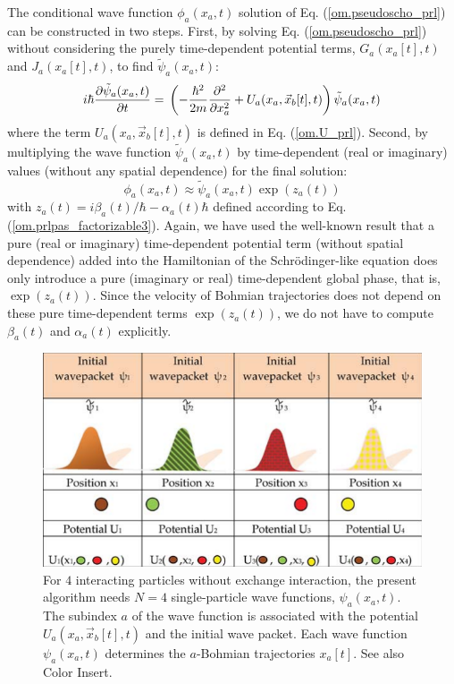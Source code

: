 \documentclass[nofootinbib, secnumarabic, amsmath, nobibnotes,11pt,aps,pra, floatfix]{revtex4-1}
\newcommand{\eref}[1]{Eq. (\ref{#1})}
\begin{document}
The conditional wave function $\phi_{a}(x_a,t)$ solution of \eref{om.pseudoscho_prl} can be constructed in two steps. First, by solving \eref{om.pseudoscho_prl} without considering the purely time-dependent potential terms, $G_{a}(x_a[t],t)$ and $J_{a}(x_a[t],t)$, to find $\tilde{\psi}_a(x_a,t)$:
\begin{equation}
\label{om.pseudoschobis_prl}
i\hbar\frac{\partial \tilde \psi_{a}(x_{a},t)}{\partial t} = \\ \left( -\frac{\hbar^2}{2m}\frac{\partial^2}{\partial {x_a^2}} + U_{a}(x_{a},\vec x_{b}[t],t) \right) \tilde\psi_{a}(x_{a},t)
\end{equation}
where the term \textit{$U_{a}(x_{a},\vec x_{b}[t],t)$} is defined in \eref{om.U_prl}. Second, by multiplying the wave function $\tilde{\psi}_a(x_a,t)$ by time-dependent (real or imaginary) values (without any spatial dependence) for the final solution:
\begin{equation}
{\phi}_a(x_a,t) \approx \tilde{\psi}_a(x_a,t) \exp (z_a(t))
\label{om.mpnocoulomb}
\end{equation}
with $z_a(t) = i\beta_a(t)/\hbar-\alpha_a(t) \hbar$ defined
according to \eref{om.prlpas_factorizable3}. Again, we have used the
well-known result that a pure (real or imaginary) time-dependent
potential term (without spatial dependence) added into the Hamiltonian of
the Schr\"odinger-like equation does only introduce a pure
(imaginary or real) time-dependent global phase, that is, $\exp (z_a(t))$.
Since the velocity of Bohmian trajectories does not depend on these
pure time-dependent terms \textit{$\exp (z_a(t))$}, we do not have
to compute $\beta_a(t)$ and $\alpha_a(t)$ explicitly.

\begin{figure}
\centering
\includegraphics{F1_04.pdf}
\caption{For $4$ interacting particles without exchange interaction, the present algorithm needs
$N = 4$ single-particle wave functions, $\psi_a(x_a,t)$. The
subindex $a$ of the wave function is associated with the potential
$U_a(x_a,\vec x_b[t],t)$ and the initial wave packet. Each wave
function $\psi_a(x_a,t)$ determines the $a$-Bohmian trajectories
$x_a[t]$. See also Color Insert.}
\label{om_fig_manyprl1}
\end{figure}
\end{document}
